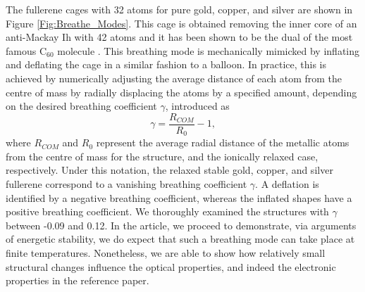 The fullerene cages with 32 atoms for pure gold, copper, and silver are shown in Figure \ref{Fig:Breathe_Modes}. This cage is obtained removing the inner core of an anti-Mackay Ih with 42 atoms and it has been shown to be the dual of the most famous C$_{60}$ molecule \cite{Trombach2016}. This breathing mode is mechanically mimicked by inflating and deflating the cage in a similar fashion to a balloon. In practice, this is achieved by numerically adjusting the average distance of each atom from the centre of mass by radially displacing the atoms by a specified amount, depending on the desired breathing coefficient $\gamma$, introduced as
\begin{equation}
    \gamma=\frac{R_{COM}}{R_{0}}-1,
\end{equation}
where $R_{COM}$ and $R_0$ represent the average radial distance of the metallic atoms from the centre of mass for the structure, and the ionically relaxed case, respectively. Under this notation, the relaxed stable gold, copper, and silver fullerene correspond to a vanishing breathing coefficient $\gamma$. A deflation is identified by a negative breathing coefficient, whereas the inflated shapes have a positive breathing coefficient. We thoroughly examined the structures with $\gamma$ between -0.09 and 0.12. In the article, we proceed to demonstrate, via arguments of energetic stability, we do expect that such a breathing mode can take place at finite temperatures. Nonetheless, we are able to show how relatively small structural changes influence the optical properties, and indeed the electronic properties in the reference paper.

